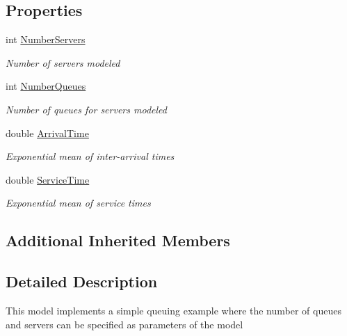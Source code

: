 \subsection*{Properties}
\begin{DoxyCompactItemize}
\item 
int \hyperlink{class_simple_queue_example_1_1_model_elements_1_1_simulation_model_queuing_a539c113ca222d4a332be24d01052afc4}{Number\+Servers}
\begin{DoxyCompactList}\small\item\em Number of servers modeled \end{DoxyCompactList}\item 
int \hyperlink{class_simple_queue_example_1_1_model_elements_1_1_simulation_model_queuing_ae59d22dc2eac49996cffe2881f1a2c37}{Number\+Queues}
\begin{DoxyCompactList}\small\item\em Number of queues for servers modeled \end{DoxyCompactList}\item 
double \hyperlink{class_simple_queue_example_1_1_model_elements_1_1_simulation_model_queuing_a2e92162a3080a19ed150384b55f0223f}{Arrival\+Time}
\begin{DoxyCompactList}\small\item\em Exponential mean of inter-\/arrival times \end{DoxyCompactList}\item 
double \hyperlink{class_simple_queue_example_1_1_model_elements_1_1_simulation_model_queuing_a940efd865f62041512942c0aaace6ced}{Service\+Time}
\begin{DoxyCompactList}\small\item\em Exponential mean of service times \end{DoxyCompactList}\end{DoxyCompactItemize}
\subsection*{Additional Inherited Members}


\subsection{Detailed Description}
This model implements a simple queuing example where the number of queues and servers can be specified as parameters of the model 



